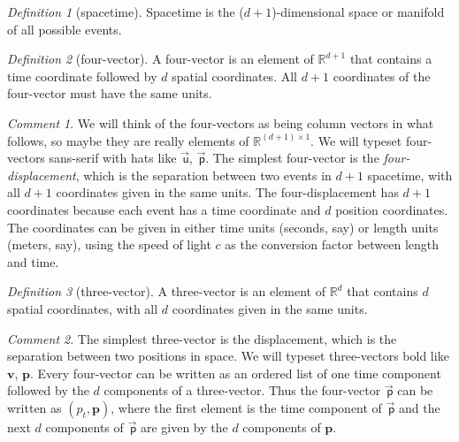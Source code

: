 \documentclass[10pt]{article}
\newcounter{par}
\theoremstyle{remark}
\newtheorem{definition}{Definition}
\theoremstyle{remark}
\newtheorem*{remark}{Comment}
\newcommand\upvec[1]{\!\vec{\,\mathrm{#1}}}
\newcommand{\tv}[1]{{\mathbf{#1}}} %
\newcommand{\fv}[1]{\upvec{\mathsf{#1}}} %
\begin{document}
\begin{definition}[spacetime]
    Spacetime is the ($d+1$)-dimensional space or manifold of all possible events.
\end{definition}

\begin{definition}[four-vector]\label{def:fv}
    A four-vector is an element of $\mathbb{R}^{d+1}$ that contains a time coordinate followed by $d$ spatial coordinates.
    All $d+1$ coordinates of the four-vector must have the same units.
\end{definition}
\begin{remark}
    We will think of the four-vectors as being column vectors in what follows, so maybe they are really elements of $\mathbb{R}^{(d+1)\times 1}$.
    We will typeset four-vectors sans-serif with hats like $\fv{u}$, $\fv{p}$.
    The simplest four-vector is the \emph{four-displacement}, which is the separation between two events in $d+1$ spacetime, with all $d+1$ coordinates given in the same units.
    The four-displacement has $d+1$ coordinates because each event has a time coordinate and $d$ position coordinates.
    The coordinates can be given in either time units (seconds, say) or length units (meters, say), using the speed of light $c$ as the conversion factor between length and time.
\end{remark}

\begin{definition}[three-vector]
    A three-vector is an element of $\mathbb{R}^{d}$ that contains $d$ spatial coordinates, with all $d$ coordinates given in the same units.
\end{definition}
\begin{remark}
    The simplest three-vector is the displacement, which is the separation between two positions in space.
    We will typeset three-vectors bold like $\tv{v}$, $\tv{p}$.
    Every four-vector can be written as an ordered list of one time component followed by the $d$ components of a three-vector.
    Thus the four-vector $\fv{p}$ can be written as $(p_t, \tv{p})$, where the first element is the time component of $\fv{p}$ and the next $d$ components of $\fv{p}$ are given by the $d$ components of $\tv{p}$.
\end{remark}
\end{document}
